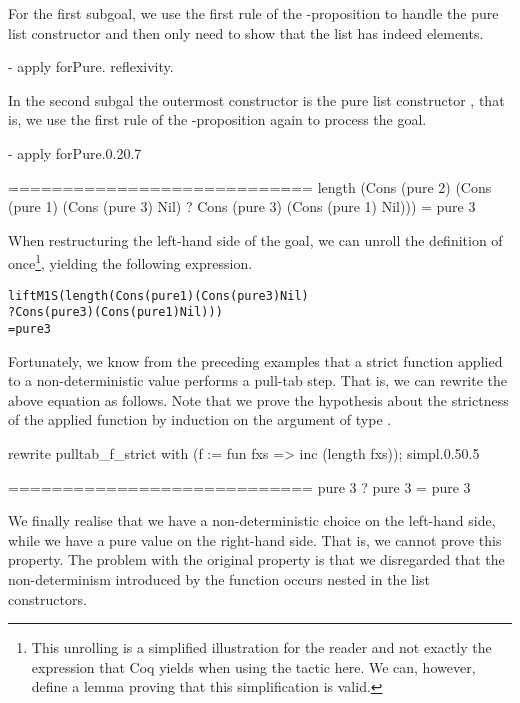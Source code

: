 For the first subgoal, we use the first rule of the \--proposition to handle the pure list constructor and then only need to show that the list has indeed  elements.

\begin{coqcode}
  - apply forPure. reflexivity.
\end{coqcode}

In the second subgal the outermost constructor is the pure list constructor , that is, we use the first rule of the \--proposition again to process the goal.

\begin{cproof1}{- apply forPure.}{0.2}{0.7}

  ============================
  length (Cons (pure 2) (Cons (pure 1) (Cons (pure 3) Nil)
                        ? Cons (pure 3) (Cons (pure 1) Nil)))
  = pure 3
\end{cproof1}

When restructuring the left\--hand side of the goal, we can unroll the definition of  once\footnote{This unrolling is a simplified illustration for the reader and not exactly the expression that Coq yields when using the tactic  here. We can, however, define a lemma proving that this simplification is valid.}, yielding the following expression.

\begin{alltt}
  liftM1 S (length (Cons (pure 1) (Cons (pure 3) Nil)
                   ? Cons (pure 3) (Cons (pure 1) Nil)))
  = pure 3
\end{alltt}

Fortunately, we know from the preceding examples that a strict function applied to a non\--deterministic value performs a pull\--tab step.
That is, we can rewrite the above equation as follows.
Note that we prove the hypothesis about the strictness of the applied function  by induction on the argument of type .

\begin{cproof1}{rewrite pulltab_f_strict with (f := fun fxs => inc (length fxs)); simpl.}{0.5}{0.5}

  ============================
  pure 3 ? pure 3 = pure 3
\end{cproof1}

We finally realise that we have a non\--deterministic choice on the left\--hand side, while we have a pure value on the right\--hand side.
That is, we cannot prove this property.
The problem with the original property is that we disregarded that the non\--determinism introduced by the function  occurs nested in the list constructors.

